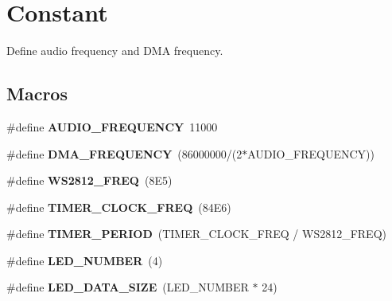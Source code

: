 \hypertarget{group___constant}{}\section{Constant}
\label{group___constant}


Define audio frequency and D\+MA frequency.  


\subsection*{Macros}
\begin{DoxyCompactItemize}
\item 
\mbox{\label{group___constant_gaae969438a57a86fddf0cf53106c9b6b4}} 
\#define {\bfseries A\+U\+D\+I\+O\+\_\+\+F\+R\+E\+Q\+U\+E\+N\+CY}~11000
\item 
\mbox{\label{group___constant_ga644d7863b10926e5fb77205f294e1964}} 
\#define {\bfseries D\+M\+A\+\_\+\+F\+R\+E\+Q\+U\+E\+N\+CY}~(86000000/(2$\ast$A\+U\+D\+I\+O\+\_\+\+F\+R\+E\+Q\+U\+E\+N\+CY))
\item 
\mbox{\label{group___constant_ga857df980c46f31dbe009560d826413a8}} 
\#define {\bfseries W\+S2812\+\_\+\+F\+R\+EQ}~(8\+E5)
\item 
\mbox{\label{group___constant_ga5f1fac9f0aaabad0683c04e44a1aefe9}} 
\#define {\bfseries T\+I\+M\+E\+R\+\_\+\+C\+L\+O\+C\+K\+\_\+\+F\+R\+EQ}~(84\+E6)
\item 
\mbox{\label{group___constant_gad888acf7c13a4bedd6541ceb5cf9bf6d}} 
\#define {\bfseries T\+I\+M\+E\+R\+\_\+\+P\+E\+R\+I\+OD}~(T\+I\+M\+E\+R\+\_\+\+C\+L\+O\+C\+K\+\_\+\+F\+R\+EQ / W\+S2812\+\_\+\+F\+R\+EQ)
\item 
\mbox{\label{group___constant_ga306db1a2fccc9c26ad114b50a88940d3}} 
\#define {\bfseries L\+E\+D\+\_\+\+N\+U\+M\+B\+ER}~(4)
\item 
\mbox{\label{group___constant_ga7af472c9efcf021651c589bb54d103fa}} 
\#define {\bfseries L\+E\+D\+\_\+\+D\+A\+T\+A\+\_\+\+S\+I\+ZE}~(L\+E\+D\+\_\+\+N\+U\+M\+B\+ER $\ast$ 24)
\item 
\mbox{\label{group___constant_ga38b56d14857b32e86b876a32957a2b63}} 

\end{DoxyCompactItemize}
